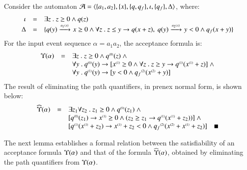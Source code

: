 \begin{example}\label{ex:quant-elim}
  Consider the automaton $\mathcal{A} = \langle \{ a_1,a_2 \}, \{ x \},
    \{ q,q_f \}, \iota, \{ q_f \}, \Delta \rangle$, where:
  \[\begin{array}{rcl}
  \iota & = & \exists z ~.~ z \geq 0 \wedge q(z) \\
  \Delta & = & \{ 
    q(y) \xrightarrow{{\scriptscriptstyle a_1(x)}}_{{\scriptstyle }} x\geq 0 \wedge \forall z ~.~ z \leq y \rightarrow q(x+z),~
    q(y) \xrightarrow{{\scriptscriptstyle a_2(x)}}_{{\scriptstyle }} y<0 \wedge q_f(x+y)
   \}
  \end{array}\]
  For the input event sequence $\alpha = a_1a_2$, the acceptance
  formula is:
  \[\begin{array}{rcl}
  \Upsilon({\alpha}) & = & \exists z ~.~ z \geq 0 \wedge {q}^{\scriptscriptstyle{({0})}}(z) ~\wedge \\
  && \forall y ~.~ {q}^{\scriptscriptstyle{({0})}}(y) \rightarrow [{x}^{\scriptscriptstyle{({1})}}\geq0 \wedge \forall z ~.~ z\geq y 
    \rightarrow {q}^{\scriptscriptstyle{({1})}}({x}^{\scriptscriptstyle{({1})}}+z)] ~\wedge \\
  && \forall y ~.~ {q}^{\scriptscriptstyle{({1})}}(y) \rightarrow [y<0 \wedge {q_f}^{\scriptscriptstyle{({2})}}({x}^{\scriptscriptstyle{({2})}}+y)]
  \end{array}\]
  The result of eliminating the path quantifiers, in prenex normal form, is shown below:
  \[\begin{array}{rcl}
  \quantform{\alpha} & = & \exists z_1\forall z_2 ~.~ z_1 \geq 0 \wedge \stamp{q}{0}(z_1) ~\wedge \\
  && [\stamp{q}{0}(z_1) \rightarrow \stamp{x}{1} \geq 0 \wedge (z_2 \geq z_1 \rightarrow \stamp{q}{1}(\stamp{x}{1}+z_2))] ~\wedge \\
  && [\stamp{q}{1}(\stamp{x}{1}+z_2) \rightarrow \stamp{x}{1}+z_2 < 0 \wedge \stamp{q_f}{2}(\stamp{x}{2}+\stamp{x}{1}+z_2)] 
  \enspace\enspace\hfill\blacksquare
  \end{array}\]
\end{example}

The next lemma establishes a formal relation between the
satisfiability of an acceptance formula $\Upsilon({\alpha})$ and that of
the formula $\widehat{\Upsilon}({\alpha})$, obtained by eliminating the path
quantifiers from $\Upsilon({\alpha})$.


